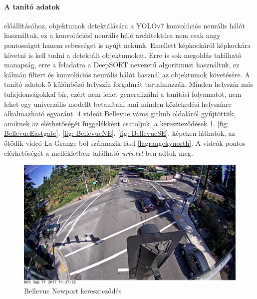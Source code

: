 \documentclass[acmtog, authorversion]{acmart}
\begin{document}
\paragraph{A tanító adatok} előállításához, objektumok detektálására a YOLOv7 \cite{wang2022yolov7} konvolúciós neurális hálót használtuk, ez a konvolúciósl neurális háló architektúra nem csak nagy pontosságot hanem sebességet is nyújt nekünk. 
Emellett képkockáról képkockára követni is kell tudni a detektált objektumokat. Erre is sok megoldás található manapság, erre a feladatra
a DeepSORT \cite{Wojke2018deep} nevezetű algoritmust használtuk, ez kálmán filtert és konvolúciós neurális hálót használ az objektumok követésére.
A tanító adatok 5 különböző helyszín forgalmát tartalmazzák. Minden helyszín más tulajdonságokkal bír, ezért nem lehet generalizálni
a tanítási folyamatot, nem lehet egy univerzális modellt betanítani ami minden közlekedési helyszínre alkalmazható egyaránt.
4 videót Bellevue város github oldaláról gyűjtöttük, amiknek az elérhetőségét függelékként csatoljuk, a kereszteződések 
\ref{fig: BellevueNewport}. \ref{fig: BellevueEastgate}. \ref{fig: BellevueNE}. \ref{fig: BellevueSE}. képeken láthatók, az ötödik videó La Grange-ból származik lásd \ref{lagrangekynorth}. A videók pontos elérhetőségét
a mellékletben található \emph{urls.txt}-ben adtuk meg.
\begin{figure}
    \includegraphics[width=1\columnwidth]{dataset_samples/Bellevue_150th_Newport.JPG}
    \caption{Bellevue Newport kereszteződés}
    \label{fig: BellevueNewport}
\end{figure}
\end{document}
